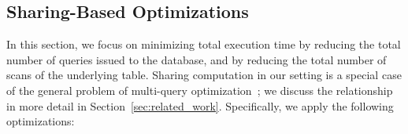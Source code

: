 

\subsection{Sharing-Based Optimizations}\label{sec:sharing-opt}
In this section, we focus on minimizing total execution time
by reducing the
total number of queries issued to the database,
and by reducing the total number of scans of the underlying table.
Sharing computation in our setting is a special case of the general problem
of multi-query optimization~\cite{DBLP:journals/tods/Sellis88}; we discuss the 
relationship in more detail in Section~\ref{sec:related_work}.
Specifically, we apply the following optimizations:

